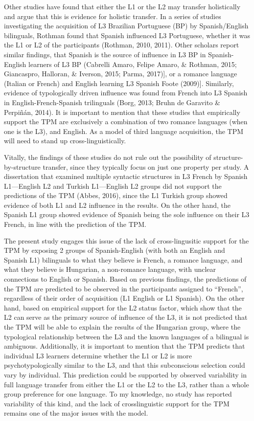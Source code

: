 \documentclass[
  man]{apa6}
\begin{document}
Other studies have found that either the L1 or the L2 may transfer holistically and argue that this is evidence for holistic transfer. In a series of studies investigating the acquisition of L3 Brazilian Portuguese (BP) by Spanish/English bilinguals, Rothman found that Spanish influenced L3 Portuguese, whether it was the L1 or L2 of the participants (Rothman, 2010, 2011). Other scholars report similar findings, that Spanish is the source of influence in L3 BP in Spanish-English learners of L3 BP (Cabrelli Amaro, Felipe Amaro, \& Rothman, 2015; Giancaspro, Halloran, \& Iverson, 2015; Parma, 2017){]}, or a romance language (Italian or French) and English learning L3 Spanish Foote (2009){]}.
Similarly, evidence of typologically driven influence was found from French into L3 Spanish in English-French-Spanish trilinguals (Borg, 2013; Bruhn de Garavito \& Perpiñán, 2014). It is important to mention that these studies that empirically support the TPM are exclusively a combination of two romance languages (when one is the L3), and English. As a model of third language acquisition, the TPM will need to stand up cross-linguistically.

Vitally, the findings of these studies do not rule out the possibility of structure-by-structure transfer, since they typically focus on just one property per study. A dissertation that examined multiple syntactic structures in L3 French by Spanish L1---English L2 and Turkish L1---English L2 groups did not support the predictions of the TPM (Abbes, 2016), since the L1 Turkish group showed evidence of both L1 and L2 influence in the results. On the other hand, the Spanish L1 group showed evidence of Spanish being the sole influence on their L3 French, in line with the prediction of the TPM.

The present study engages this issue of the lack of cross-lingusitic support for the TPM by exposing 2 groups of Spanish-English (with both an English and Spanish L1) bilinguals to what they believe is French, a romance language, and what they believe is Hungarian, a non-romance language, with unclear connections to English or Spanish. Based on previous findings, the predictions of the TPM are predicted to be observed in the participants assigned to ``French'', regardless of their order of acquisition (L1 English or L1 Spanish).
On the other hand, based on empirical support for the L2 status factor, which show that the L2 can serve as the primary source of influence of the L3, it is not predicted that the TPM will be able to explain the results of the Hungarian group, where the typological relationship between the L3 and the known languages of a bilingual is ambiguous.
Additionally, it is important to mention that the TPM predicts that individual L3 learners determine whether the L1 or L2 is more psychotypologically similar to the L3, and that this subconscious selection could vary by individual.
This prediction could be supported by observed variability in full language transfer from either the L1 or the L2 to the L3, rather than a whole group preference for one language. To my knowledge, no study has reported variability of this kind, and the lack of crosslinguistic support for the TPM remains one of the major issues with the model.
\end{document}
